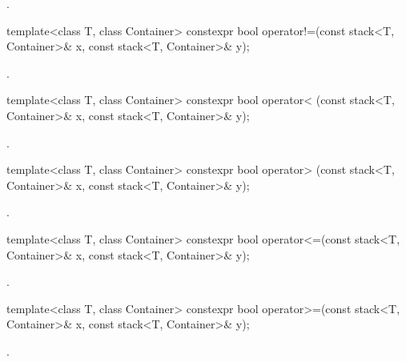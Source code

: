 \begin{itemdescr}
\pnum
\returns
{}.
\end{itemdescr}

%
\begin{itemdecl}
template<class T, class Container>
  constexpr bool operator!=(const stack<T, Container>& x, const stack<T, Container>& y);
\end{itemdecl}

\begin{itemdescr}
\pnum
\returns
{}.
\end{itemdescr}

%
\begin{itemdecl}
template<class T, class Container>
  constexpr bool operator< (const stack<T, Container>& x, const stack<T, Container>& y);
\end{itemdecl}

\begin{itemdescr}
\pnum
\returns
{}.
\end{itemdescr}

%
\begin{itemdecl}
template<class T, class Container>
  constexpr bool operator> (const stack<T, Container>& x, const stack<T, Container>& y);
\end{itemdecl}

\begin{itemdescr}
\pnum
\returns
{}.
\end{itemdescr}

%
\begin{itemdecl}
template<class T, class Container>
  constexpr bool operator<=(const stack<T, Container>& x, const stack<T, Container>& y);
\end{itemdecl}

\begin{itemdescr}
\pnum
\returns
{}.
\end{itemdescr}

%
\begin{itemdecl}
template<class T, class Container>
  constexpr bool operator>=(const stack<T, Container>& x, const stack<T, Container>& y);
\end{itemdecl}

\begin{itemdescr}
\pnum
\returns
{}.
\end{itemdescr}

